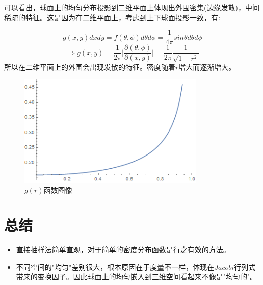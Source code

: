 \documentclass[hyperref,UTF8]{ctexart}
\begin{document}
	
	\begin{flushleft}
		可以看出，球面上的均匀分布投影到二维平面上体现出外围密集(边缘发散)，中间稀疏的特征。这是因为在二维平面上，考虑到上下球面投影一致，有:
	
	$$g(x,y)dxdy=f(\theta,\phi)d\theta d\phi=\frac{1}{4\pi}sin\theta d\theta d\phi$$
	$$\Rightarrow g(x,y)=\frac{1}{2\pi}\vert \frac{\partial(\theta,\phi)}{\partial(x,y)}\vert=\frac{1}{2\pi}\frac{1}{\sqrt{1-r^2}}$$
	所以在二维平面上的外围会出现发散的特征。密度随着$r$增大而逐渐增大。
	
		\begin{figure}[H]
			\centering\includegraphics[width=3.5in]{../func.png}
			\caption{$g(r)$函数图像}
		\end{figure}
	\end{flushleft}
	
	
	\section{总结}
	\begin{itemize}
		\item 直接抽样法简单直观，对于简单的密度分布函数是行之有效的方法。
		\item 不同空间的"均匀"差别很大，根本原因在于度量不一样，体现在$Jacobi$行列式带来的变换因子。因此球面上的均匀嵌入到三维空间看起来不像是"均匀的"。
	\end{itemize}
	\clearpage
\end{document}
